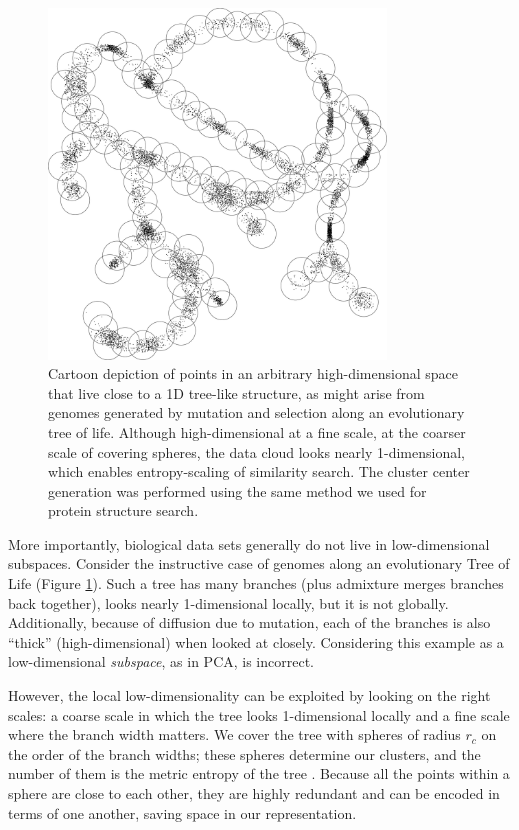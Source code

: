 \documentclass[review,preprint,12pt]{elsarticle}
\renewcommand{\cite}{\citep} %
\theoremstyle{definition}
\theoremstyle{remark}
\numberwithin{equation}{section}
\begin{document}
\begin{figure}[btp]
    \centering
    \includegraphics[width=0.8\textwidth]{assets/treepoints/treepoints2D_clusters.png}
    \caption{Cartoon depiction of points in an arbitrary high-dimensional space that live close to a 1D tree-like structure, as might arise from genomes generated by mutation and selection along an evolutionary tree of life. 
Although high-dimensional at a fine scale, at the coarser scale of covering spheres, the data cloud looks nearly 1-dimensional, which enables entropy-scaling of similarity search. The cluster center generation was performed using the same method we used for protein structure search.}
    \label{fig:tree}
\end{figure}
More importantly, biological data sets generally do not live in low-dimensional subspaces.
Consider the instructive case of genomes along an evolutionary Tree of Life (Figure \ref{fig:tree}).
Such a tree has many branches (plus admixture merges branches back together),
looks nearly 1-dimensional locally, but it is not globally.
Additionally, because of diffusion due to mutation, each of the branches is also ``thick'' (high-dimensional) when looked at closely.
Considering this example as a low-dimensional \textit{subspace}, as in PCA, is 
incorrect.

However, the local low-dimensionality can be exploited by looking on the right scales: a coarse scale in which the tree looks 1-dimensional locally and a fine scale where the branch width matters.
We cover the tree with spheres of radius $r_c$ on the order of the branch widths; these spheres determine our clusters, and the number of them is the metric entropy of the tree \cite{tao2008product}.
Because all the points within a sphere are close to each other, they are highly redundant and can be encoded in terms of one another, saving space in our representation.
\end{document}
